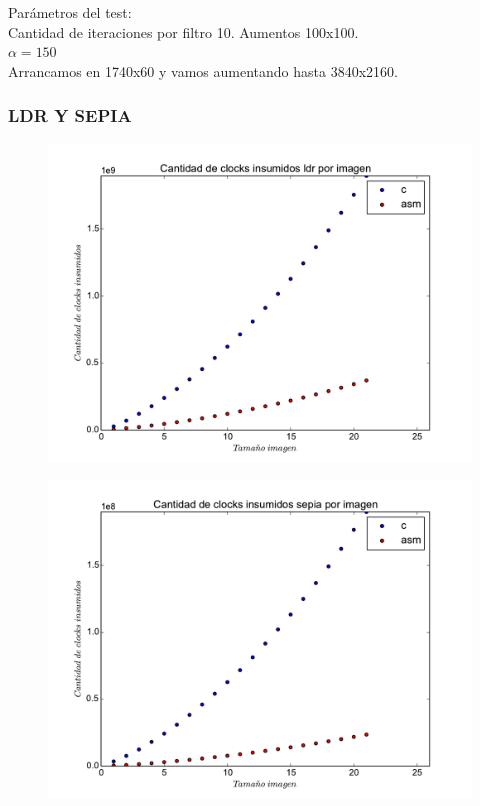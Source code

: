 Parámetros del test: \\
Cantidad de iteraciones por filtro 10. Aumentos 100x100.\\
$\alpha = 150$\\
Arrancamos en 1740x60 y vamos aumentando hasta 3840x2160.

\subsubsection*{LDR Y SEPIA}  

\begin{figure}
  \begin{center}
	\includegraphics[scale=0.5]{ldrall.pdf}
  \end{center}
\end{figure}

\begin{figure}
  \begin{center}
	\includegraphics[scale=0.5]{sepiaall.pdf}
  \end{center}
\end{figure}

